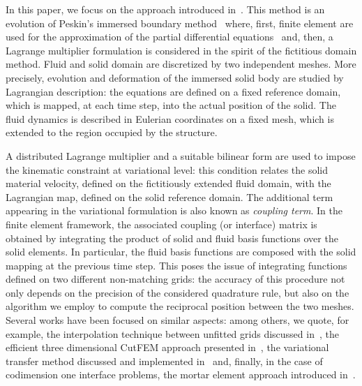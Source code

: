 \documentclass[oneside]{amsart} %
\begin{document}
	In this paper, we focus on the approach introduced in~\cite{2015}.
	This method is an evolution of Peskin's immersed boundary
	method~\cite{peskin1972flow,peskin2002immersed} where, first, finite element are
	used for the approximation of the partial differential
	equations~\cite{boffi2003finite} and, then, a
	Lagrange multiplier formulation is considered in the spirit of the
	fictitious
	domain method.
	Fluid and solid domain are discretized by two independent meshes. More
	precisely, evolution and deformation of the immersed solid body are studied by
	Lagrangian description: the equations are defined on a fixed reference domain,
	which is mapped, at each time step, into the actual position of the solid. The
	fluid dynamics is described in Eulerian coordinates on a fixed mesh, which is
	extended to the region occupied by the structure.
	
	A distributed Lagrange multiplier and a suitable bilinear form are
	used to impose the kinematic constraint at variational level: this condition relates the solid material velocity, defined on the fictitiously extended fluid domain, with the Lagrangian map, defined on the solid reference domain. The additional term appearing in the variational formulation is also known as \textit{coupling term}. In the finite element framework, the associated coupling (or interface) matrix is obtained by integrating the product of solid and fluid basis functions over the solid elements.
	In particular, the fluid basis functions are composed with the solid
	mapping at the previous time step. This poses the issue of integrating functions defined on two different non-matching grids: the accuracy of this procedure not only depends on the precision of the considered quadrature rule, but also on the algorithm we employ to compute the reciprocal position between the two meshes.
	Several works have been focused on similar aspects: among others, we quote, for example, the interpolation technique between unfitted grids discussed in~\cite{fromm2023interpolation}, the efficient three dimensional CutFEM approach presented in~\cite{massing2013efficient}, the variational transfer method discussed and implemented in~\cite{krause2016parallel} and, finally, in the case of codimension one interface problems, the mortar element approach introduced in~\cite{maday2002influence}.
	
\end{document}
